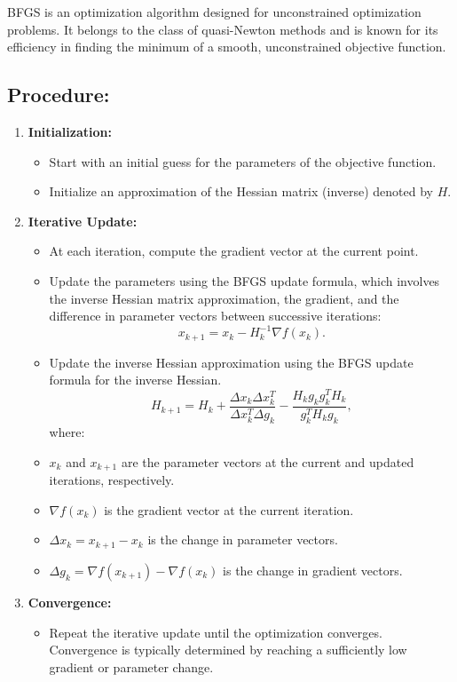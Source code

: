 \documentclass[
  letterpaper,
  DIV=11,
  numbers=noendperiod]{scrreprt}
\providecommand{\tightlist}{%
  \setlength{\itemsep}{0pt}\setlength{\parskip}{0pt}}\usepackage{longtable,booktabs,array}
\begin{document}
BFGS is an optimization algorithm designed for unconstrained
optimization problems. It belongs to the class of quasi-Newton methods
and is known for its efficiency in finding the minimum of a smooth,
unconstrained objective function.

\subsection{Procedure:}\label{procedure}

\begin{enumerate}
\def\labelenumi{\arabic{enumi}.}
\tightlist
\item
  \textbf{Initialization:}

  \begin{itemize}
  \tightlist
  \item
    Start with an initial guess for the parameters of the objective
    function.
  \item
    Initialize an approximation of the Hessian matrix (inverse) denoted
    by \(H\).\\
  \end{itemize}
\item
  \textbf{Iterative Update:}

  \begin{itemize}
  \tightlist
  \item
    At each iteration, compute the gradient vector at the current point.
  \item
    Update the parameters using the BFGS update formula, which involves
    the inverse Hessian matrix approximation, the gradient, and the
    difference in parameter vectors between successive iterations:
    \[x_{k+1} = x_k - H_k^{-1} \nabla f(x_k).\]
  \item
    Update the inverse Hessian approximation using the BFGS update
    formula for the inverse Hessian.
    \[H_{k+1} = H_k + \frac{\Delta x_k \Delta x_k^T}{\Delta x_k^T \Delta g_k} - \frac{H_k g_k g_k^T H_k}{g_k^T H_k g_k},\]
    where:
  \item
    \(x_k\) and \(x_{k+1}\) are the parameter vectors at the current and
    updated iterations, respectively.
  \item
    \(\nabla f(x_k)\) is the gradient vector at the current iteration.
  \item
    \(\Delta x_k = x_{k+1} - x_k\) is the change in parameter vectors.
  \item
    \(\Delta g_k = \nabla f(x_{k+1}) - \nabla f(x_k)\) is the change in
    gradient vectors.
  \end{itemize}
\item
  \textbf{Convergence:}

  \begin{itemize}
  \tightlist
  \item
    Repeat the iterative update until the optimization converges.
    Convergence is typically determined by reaching a sufficiently low
    gradient or parameter change.
  \end{itemize}
\end{enumerate}
\end{document}
